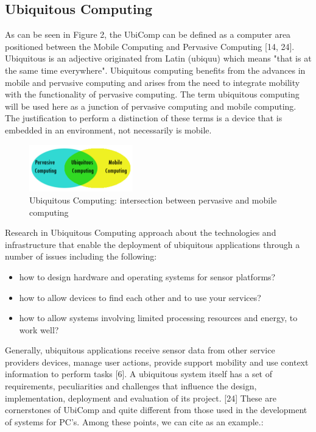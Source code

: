 \documentclass{acm_proc_article-sp}
\begin{document}
\subsection{Ubiquitous Computing}
As can be seen in Figure 2, the UbiComp can be defined as a computer area positioned between the Mobile Computing and Pervasive Computing [14, 24]. Ubiquitous is an adjective originated from Latin (ubiquu) which means "that is at the same time everywhere". Ubiquitous computing benefits from the advances in mobile and pervasive computing and arises from the need to integrate mobility with the functionality of pervasive computing. The term ubiquitous computing will be used here as a junction of pervasive computing and mobile computing. The justification to perform a distinction of these terms is a device that is embedded in an environment, not necessarily is mobile.
\begin{figure}[h]
    \includegraphics[width=0.4\textwidth,natwidth=610,natheight=642]{pictures/ubiq.png}
    \caption{Ubiquitous Computing: intersection between pervasive and mobile computing}
\end{figure}
\newline
\newline
Research in Ubiquitous Computing approach about the technologies and infrastructure that enable the deployment of ubiquitous applications through a number of issues including the following:

\begin{itemize}
\item how to design hardware and operating systems for sensor platforms?
\item how to allow devices to find each other and to use your services?
\item how to allow systems involving limited processing resources and energy, to work well?
\end{itemize}

Generally, ubiquitous applications receive sensor data from other service providers devices, manage user actions, provide support mobility and use context information to perform tasks [6]. A ubiquitous system itself has a set of requirements, peculiarities and challenges that influence the design, implementation, deployment and evaluation of its project. [24] These are cornerstones of UbiComp and quite different from those used in the development of systems for PC’s. Among these points, we can cite as an example.:
\end{document}

